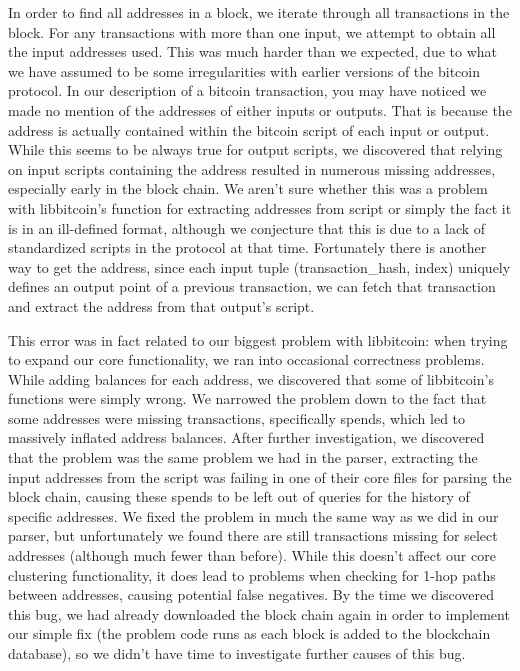 \documentclass[10pt, letterpaper, twocolumn, twoside]{article}
\begin{document}
In order to find all addresses in a block, we iterate through all transactions in the block. For any transactions with more than one input, we attempt to obtain all the input addresses used. This was much harder than we expected, due to what we have assumed to be some irregularities with earlier versions of the bitcoin protocol. In our description of a bitcoin transaction, you may have noticed we made no mention of the addresses of either inputs or outputs. That is because the address is actually contained within the bitcoin script of each input or output. While this seems to be always true for output scripts, we discovered that relying on input scripts containing the address resulted in numerous missing addresses, especially early in the block chain. We aren't sure whether this was a problem with libbitcoin's function for extracting addresses from script or simply the fact it is in an ill-defined format, although we conjecture that this is due to a lack of standardized scripts in the protocol at that time. Fortunately there is another way to get the address, since each input tuple (transaction\_hash, index) uniquely defines an output point of a previous transaction, we can fetch that transaction and extract the address from that output's script.

This error was in fact related to our biggest problem with libbitcoin: when trying to expand our core functionality, we ran into occasional correctness problems. While adding balances for each address, we discovered that some of libbitcoin's functions were simply wrong. We narrowed the problem down to the fact that some addresses were missing transactions, specifically spends, which led to massively inflated address balances. After further investigation, we discovered that the problem was the same problem we had in the parser, extracting the input addresses from the script was failing in one of their core files for parsing the block chain, causing these spends to be left out of queries for the history of specific addresses. We fixed the problem in much the same way as we did in our parser, but unfortunately we found there are still transactions missing for select addresses (although much fewer than before). While this doesn't affect our core clustering functionality, it does lead to problems when checking for 1-hop paths between addresses, causing potential false negatives. By the time we discovered this bug, we had already downloaded the block chain again in order to implement our simple fix (the problem code runs as each block is added to the blockchain database), so we didn't have time to investigate further causes of this bug.
\end{document}
